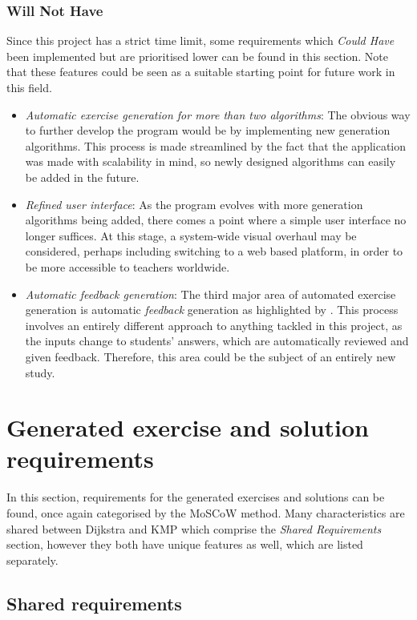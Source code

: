 \documentclass{l4proj}
\begin{document}
\subsubsection{Will Not Have}
Since this project has a strict time limit, some requirements which \emph{Could Have} been implemented but are prioritised lower can be found in this section. Note that these features could be seen as a suitable starting point for future work in this field.
\begin{itemize}
	\item
	\emph{Automatic exercise generation for more than two algorithms}: The obvious way to further develop the program would be by implementing new generation algorithms. This process is made streamlined by the fact that the application was made with scalability in mind, so newly designed algorithms can easily be added in the future.
	\item
	\emph{Refined user interface}: As the program evolves with more generation algorithms being added, there comes a point where a simple user interface no longer suffices. At this stage, a system-wide visual overhaul may be considered, perhaps including switching to a web based platform, in order to be more accessible to teachers worldwide. 
	\item
	\emph{Automatic feedback generation}: The third major area of automated exercise generation is automatic \emph{feedback} generation as highlighted by \cite{}. This process involves an entirely different approach to anything tackled in this project, as the inputs change to students' answers, which are automatically reviewed and given feedback. Therefore, this area could be the subject of an entirely new study.
\end{itemize}

\section{Generated exercise and solution requirements}

In this section, requirements for the generated exercises and solutions can be found, once again categorised by the MoSCoW method. Many characteristics are shared between Dijkstra and KMP which comprise the \emph{Shared Requirements} section, however they both have unique features as well, which are listed separately.

\subsection{Shared requirements}
\end{document}
